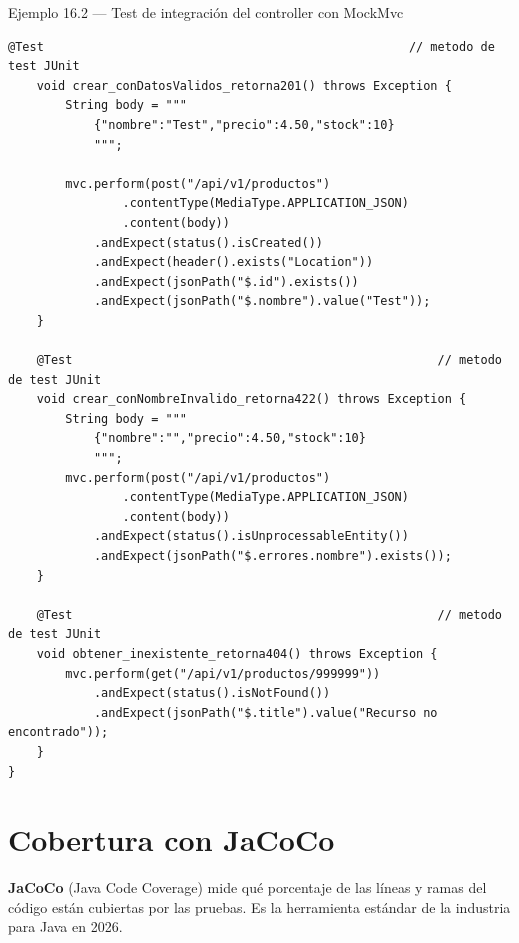 \documentclass[11pt,a4paper,openany]{book}
\begin{document}
\begin{cajaejemplo}{Ejemplo 16.2 --- Test de integración del controller con MockMvc}
\begin{lstlisting}[style=java,caption={ProductoControllerIT.java},label=lst:16.2]
    @Test                                                   // metodo de test JUnit
    void crear_conDatosValidos_retorna201() throws Exception {
        String body = """
            {"nombre":"Test","precio":4.50,"stock":10}
            """;

        mvc.perform(post("/api/v1/productos")
                .contentType(MediaType.APPLICATION_JSON)
                .content(body))
            .andExpect(status().isCreated())
            .andExpect(header().exists("Location"))
            .andExpect(jsonPath("$.id").exists())
            .andExpect(jsonPath("$.nombre").value("Test"));
    }

    @Test                                                   // metodo de test JUnit
    void crear_conNombreInvalido_retorna422() throws Exception {
        String body = """
            {"nombre":"","precio":4.50,"stock":10}
            """;
        mvc.perform(post("/api/v1/productos")
                .contentType(MediaType.APPLICATION_JSON)
                .content(body))
            .andExpect(status().isUnprocessableEntity())
            .andExpect(jsonPath("$.errores.nombre").exists());
    }

    @Test                                                   // metodo de test JUnit
    void obtener_inexistente_retorna404() throws Exception {
        mvc.perform(get("/api/v1/productos/999999"))
            .andExpect(status().isNotFound())
            .andExpect(jsonPath("$.title").value("Recurso no encontrado"));
    }
}
\end{lstlisting}
\end{cajaejemplo}

\section{Cobertura con JaCoCo}

\textbf{JaCoCo} (Java Code Coverage) mide qué porcentaje de las
líneas y ramas del código están cubiertas por las pruebas. Es la
herramienta estándar de la industria para Java en 2026.
\end{document}
